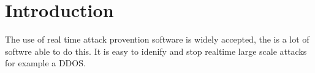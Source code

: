 
\chapter{Introduction}
The use of real time attack provention software is widely accepted, the is a lot of softwre able to do this. It is easy to idenify and stop realtime large scale attacks for example a DDOS.